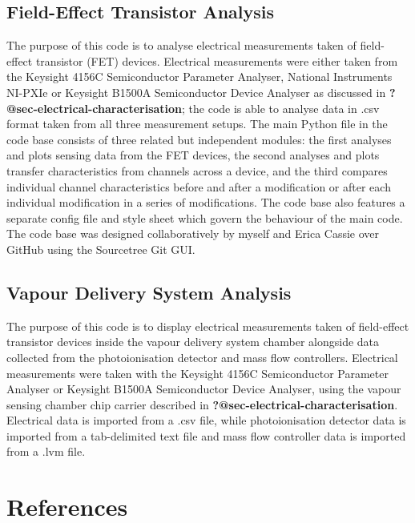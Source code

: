 \documentclass[
  a4paper,
]{scrbook}
\begin{document}
\hypertarget{sec-field-effect-transistor-analysis}{%
\section{Field-Effect Transistor
Analysis}\label{sec-field-effect-transistor-analysis}}

The purpose of this code is to analyse electrical measurements taken of
field-effect transistor (FET) devices. Electrical measurements were
either taken from the Keysight 4156C Semiconductor Parameter Analyser,
National Instruments NI-PXIe or Keysight B1500A Semiconductor Device
Analyser as discussed in \textbf{?@sec-electrical-characterisation}; the
code is able to analyse data in .csv format taken from all three
measurement setups. The main Python file in the code base consists of
three related but independent modules: the first analyses and plots
sensing data from the FET devices, the second analyses and plots
transfer characteristics from channels across a device, and the third
compares individual channel characteristics before and after a
modification or after each individual modification in a series of
modifications. The code base also features a separate config file and
style sheet which govern the behaviour of the main code. The code base
was designed collaboratively by myself and Erica Cassie over GitHub
using the Sourcetree Git GUI.

\hypertarget{sec-vapour-delivery-analysis}{%
\section{Vapour Delivery System
Analysis}\label{sec-vapour-delivery-analysis}}

The purpose of this code is to display electrical measurements taken of
field-effect transistor devices inside the vapour delivery system
chamber alongside data collected from the photoionisation detector and
mass flow controllers. Electrical measurements were taken with the
Keysight 4156C Semiconductor Parameter Analyser or Keysight B1500A
Semiconductor Device Analyser, using the vapour sensing chamber chip
carrier described in \textbf{?@sec-electrical-characterisation}.
Electrical data is imported from a .csv file, while photoionisation
detector data is imported from a tab-delimited text file and mass flow
controller data is imported from a .lvm file.

\hypertarget{references}{%
\chapter*{References}\label{references}}


\begingroup
\raggedright

\printbibliography[heading=none]

\endgroup

\newpage{}

\hfill\break

\thispagestyle{empty}

\mbox{~} \clearpage \newpage


\backmatter
\end{document}
